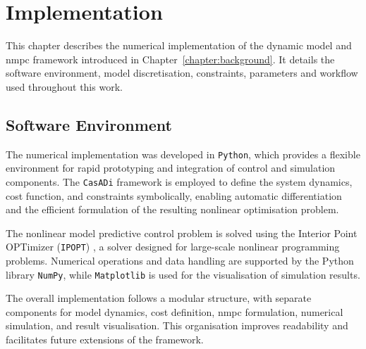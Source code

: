 \chapter{Implementation}
\label{chapter:implementation}

This chapter describes the numerical implementation of the dynamic model and \gls{nmpc} framework introduced in Chapter~\ref{chapter:background}. It details the software environment, model discretisation, constraints, parameters and workflow used throughout this work.

\section{Software Environment}
\label{sec:software_env}

The numerical implementation was developed in \texttt{Python}, which provides a flexible environment for rapid prototyping and integration of control and simulation components. The \texttt{CasADi} \cite{anderssonCasADiSoftwareFramework2019} framework is employed to define the system dynamics, cost function, and constraints symbolically, enabling automatic differentiation and the efficient formulation of the resulting nonlinear optimisation problem.

The nonlinear model predictive control problem is solved using the Interior Point OPTimizer (\texttt{IPOPT}) \cite{wachterImplementationInteriorpointFilter2006}, a solver designed for large-scale nonlinear programming problems. Numerical operations and data handling are supported by the Python library \texttt{NumPy}, while \texttt{Matplotlib} is used for the visualisation of simulation results.

The overall implementation follows a modular structure, with separate components for model dynamics, cost definition, \gls{nmpc} formulation, numerical simulation, and result visualisation. This organisation improves readability and facilitates future extensions of the framework.



